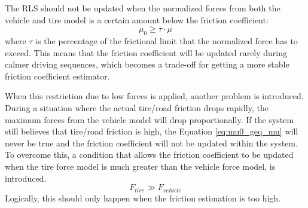 The RLS should not be updated when the normalized forces from both the vehicle and tire model is a certain amount below the friction coefficient:
\begin{equation}
	\mu_{0} \geq \tau \cdot \mu
	\label{eq:mu0_geq_mu}
\end{equation}
where $ \tau $ is the percentage of the frictional limit that the normalized force has to exceed. This means that the friction coefficient will be updated rarely during calmer driving sequences, which becomes a trade-off for getting a more stable friction coefficient estimator. 

When this restriction due to low forces is applied, another problem is introduced. During a situation where the actual tire/road friction drops rapidly, the maximum forces from the vehicle model will drop proportionally. If the system still believes that tire/road friction is high, the Equation \ref{eq:mu0_geq_mu} will never be true and the friction coefficient will not be updated within the system. To overcome this, a condition that allows the friction coefficient to be updated when the tire force model is much greater than the vehicle force model, is introduced.
\begin{equation}
	F_{tire} \gg F_{vehicle}
\end{equation}
Logically, this should only happen when the friction estimation is too high. 

